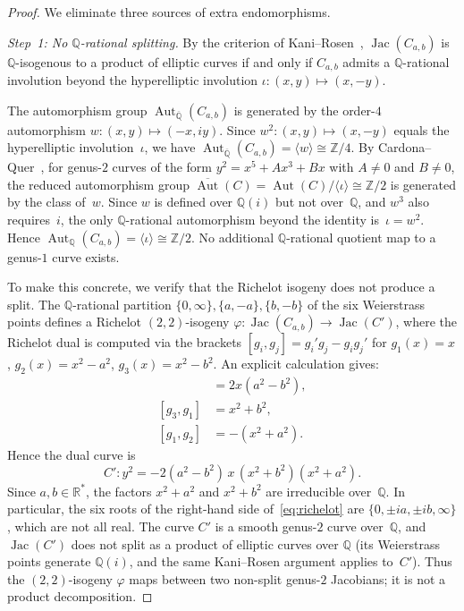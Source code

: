\documentclass[11pt,a4paper]{article}
\newcommand{\Jac}{\operatorname{Jac}}
\newcommand{\Aut}{\operatorname{Aut}}
\newcommand{\Qbar}{\overline{\mathbb{Q}}}
\theoremstyle{definition}
\theoremstyle{remark}
\begin{document}
\begin{proof}
  We eliminate three sources of extra endomorphisms.

  \medskip
  \noindent\emph{Step~1: No $\mathbb{Q}$-rational splitting.}
  By the criterion of Kani--Rosen~\cite{KaniRosen}, $\Jac(C_{a,b})$
  is $\mathbb{Q}$-isogenous to a product of elliptic curves if and
  only if $C_{a,b}$ admits a $\mathbb{Q}$-rational involution
  beyond the hyperelliptic involution $\iota\colon (x,y) \mapsto (x,-y)$.

  The automorphism group $\Aut_{\Qbar}(C_{a,b})$ is generated by
  the order-$4$ automorphism $w\colon (x,y) \mapsto (-x, iy)$.
  Since $w^2\colon (x,y) \mapsto (x, -y)$ equals the hyperelliptic
  involution~$\iota$, we have
  $\Aut_{\Qbar}(C_{a,b}) = \langle w \rangle \cong \mathbb{Z}/4$.
  By Cardona--Quer~\cite{CardonaQuer}, for genus-$2$ curves of the
  form $y^2 = x^5 + Ax^3 + Bx$ with $A \ne 0$ and $B \ne 0$,
  the reduced automorphism group
  $\overline{\Aut}(C) = \Aut(C)/\langle\iota\rangle \cong \mathbb{Z}/2$
  is generated by the class of~$w$.
  Since $w$ is defined over $\mathbb{Q}(i)$ but not over~$\mathbb{Q}$,
  and $w^3$ also requires~$i$, the only $\mathbb{Q}$-rational
  automorphism beyond the identity is~$\iota = w^2$.
  Hence $\Aut_{\mathbb{Q}}(C_{a,b}) = \langle \iota \rangle \cong \mathbb{Z}/2$.
  No additional $\mathbb{Q}$-rational quotient map to a genus-$1$
  curve exists.

  To make this concrete, we verify that the Richelot isogeny
  does not produce a split.
  The $\mathbb{Q}$-rational partition
  $\{0, \infty\}, \{a, -a\}, \{b, -b\}$ of the six Weierstrass
  points defines a Richelot $(2,2)$-isogeny
  $\varphi\colon \Jac(C_{a,b}) \to \Jac(C')$,
  where the Richelot dual is computed via the brackets
  $[g_i, g_j] = g_i' g_j - g_i g_j'$ for $g_1(x) = x$,
  $g_2(x) = x^2 - a^2$, $g_3(x) = x^2 - b^2$.
  An explicit calculation gives:
  \begin{align*}
    [g_2, g_3] &= 2x(a^2 - b^2), \\
    [g_3, g_1] &= x^2 + b^2, \\
    [g_1, g_2] &= -(x^2 + a^2).
  \end{align*}
  Hence the dual curve is
  \begin{equation}\label{eq:richelot}
    C'\colon y^2 = -2(a^2 - b^2)\, x\,(x^2 + b^2)(x^2 + a^2).
  \end{equation}
  Since $a, b \in \mathbb{R}^*$, the factors $x^2 + a^2$ and
  $x^2 + b^2$ are irreducible over~$\mathbb{Q}$.
  In particular, the six roots of the right-hand side of~\eqref{eq:richelot}
  are $\{0, \pm ia, \pm ib, \infty\}$, which are not all real.
  The curve $C'$ is a smooth genus-$2$ curve over~$\mathbb{Q}$,
  and $\Jac(C')$ does not split as a product of elliptic curves
  over $\mathbb{Q}$ (its Weierstrass points generate $\mathbb{Q}(i)$,
  and the same Kani--Rosen argument applies to~$C'$).
  Thus the $(2,2)$-isogeny $\varphi$ maps between two non-split
  genus-$2$ Jacobians; it is not a product decomposition.


\end{proof}
\end{document}
